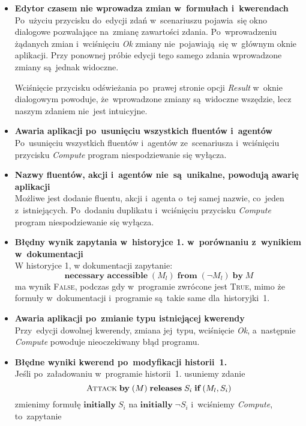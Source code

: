 \documentclass[11pt,a4paper]{article}
\begin{document}
\begin{itemize}
    \item \textbf{Edytor czasem nie wprowadza zmian w~formułach i~kwerendach} \\
    Po~użyciu przycisku do~edycji zdań w~scenariuszu pojawia~się okno dialogowe pozwalające na~zmianę zawartości zdania.
    Po~wprowadzeniu żądanych zmian i~wciśnięciu \emph{Ok} zmiany nie~pojawiają~się w~głównym oknie aplikacji.
    Przy ponownej próbie edycji tego samego zdania wprowadzone zmiany są~jednak widoczne.

    Wciśnięcie przycisku odświeżania po~prawej stronie opcji \emph{Result} w~oknie dialogowym powoduje, że~wprowadzone zmiany są~widoczne wszędzie, lecz naszym zdaniem nie~jest intuicyjne.
    \item \textbf{Awaria aplikacji po~usunięciu wszystkich fluentów i~agentów} \\
    Po~usunięciu wszystkich fluentów i~agentów ze~scenariusza i~wciśnięciu przycisku \emph{Compute} program niespodziewanie się wyłącza.
    \item \textbf{Nazwy fluentów, akcji i~agentów nie~są~unikalne, powodują awarię aplikacji} \\
    Możliwe jest dodanie fluentu, akcji i~agenta o~tej samej nazwie, co~jeden z~istniejących.
    Po~dodaniu duplikatu i~wciśnięciu przycisku \emph{Compute} program niespodziewanie się wyłącza.
    \item \textbf{Błędny wynik zapytania w~historyjce 1. w~porównaniu z~wynikiem w~dokumentacji} \\
    W historyjce 1, w dokumentacji zapytanie: 
    $$\textbf{necessary accessible} \; (M_l) \; \textbf{from} \; (\neg M_l) \; \textbf{by} \; {M}$$
    ma wynik \textsc{False}, podczas gdy w~programie zwrócone jest \textsc{True}, mimo że formuły w~dokumentacji i~programie są~takie same dla~historyjki~1.
    \item \textbf{Awaria aplikacji po~zmianie typu istniejącej kwerendy} \\
    Przy~edycji dowolnej kwerendy, zmiana jej~typu, wciśnięcie \emph{Ok}, a~następnie \emph{Compute} powoduje nieoczekiwany błąd programu.
    \item \textbf{Błędne wyniki kwerend po~modyfikacji historii~1.} \\
    Jeśli po~załadowaniu w~programie historii~1. usuniemy zdanie
    $$\textsc{Attack} \; \textbf{by} \; (M) \; \textbf{releases} \; S_i \; \textbf{if} \; (M_l, S_i) $$
    zmienimy formułę $ \textbf{initially} \; S_i $ na $ \textbf{initially} \; \neg S_i $ i~wciśniemy \emph{Compute}, to~zapytanie

\end{itemize}
\end{document}

